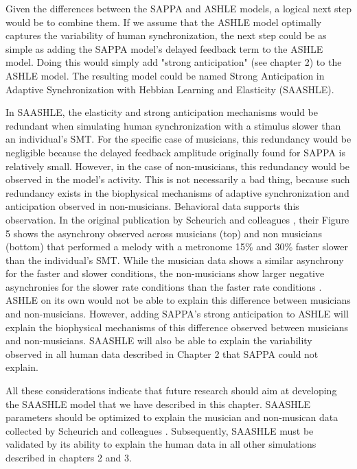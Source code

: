 \documentclass{report}
\begin{document}
Given the differences between the SAPPA and ASHLE models, a logical next step would be to combine them. If we assume that the ASHLE model optimally captures the variability of human synchronization, the next step could be as simple as adding the SAPPA model's delayed feedback term to the ASHLE model. Doing this would simply add "strong anticipation" (see chapter 2) to the ASHLE model. The resulting model could be named Strong Anticipation in Adaptive Synchronization with Hebbian Learning and Elasticity (SAASHLE). 

In SAASHLE, the elasticity and strong anticipation mechanisms would be redundant when simulating human synchronization with a stimulus slower than an individual's SMT. For the specific case of musicians, this redundancy would be negligible because the delayed feedback amplitude originally found for SAPPA is relatively small. However, in the case of non-musicians, this redundancy would be observed in the model's activity. This is not necessarily a bad thing, because such redundancy exists in the biophysical mechanisms of adaptive synchronization and anticipation observed in non-musicians. Behavioral data supports this observation. In the original publication by Scheurich and colleagues \cite{scheurich2018tapping}, their Figure 5 shows the asynchrony observed across musicians (top) and non musicians (bottom) that performed a melody with a metronome 15\% and 30\% faster slower than the individual's SMT. While the musician data shows a similar asynchrony for the faster and slower conditions, the non-musicians show larger negative asynchronies for the slower rate conditions than the faster rate conditions \cite{scheurich2018tapping}. ASHLE on its own would not be able to explain this difference between musicians and non-musicians. However, adding SAPPA's strong anticipation to ASHLE will explain the biophysical mechanisms of this difference observed between musicians and non-musicians. SAASHLE will also be able to explain the variability observed in all human data described in Chapter 2 that SAPPA could not explain. 

All these considerations indicate that future research should aim at developing the SAASHLE model that we have described in this chapter. SAASHLE parameters should be optimized to explain the musician and non-musican data collected by Scheurich and colleagues \cite{scheurich2018tapping}. Subsequently, SAASHLE must be validated by its ability to explain the human data in all other simulations described in chapters 2 and 3. 
\end{document}
